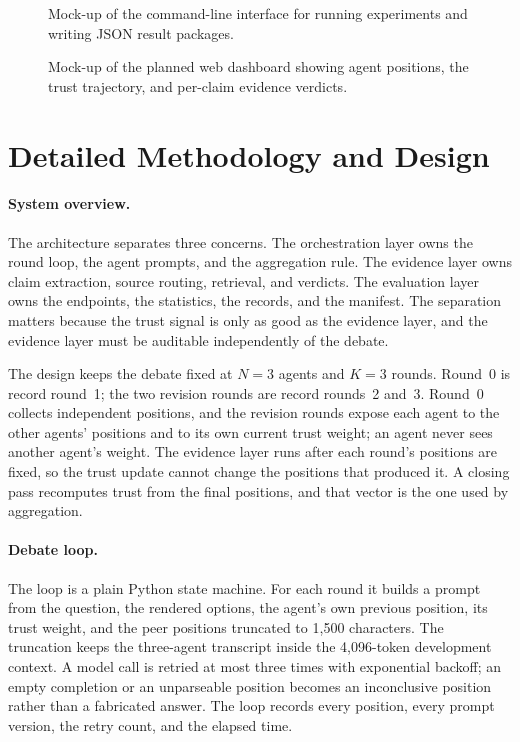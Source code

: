 \begin{figure}[H]
  \centering
  \caption{Mock-up of the command-line interface for running experiments and writing JSON result packages.}
  \label{fig:cli}
\end{figure}

\begin{figure}[H]
  \centering
  \caption{Mock-up of the planned web dashboard showing agent positions, the trust trajectory, and per-claim evidence verdicts.}
  \label{fig:dashboard}
\end{figure}

\section{Detailed Methodology and Design}\label{sec:detailed-methodology}

\paragraph*{System overview.}
The architecture separates three concerns. The orchestration layer owns the round loop, the agent prompts, and the aggregation rule. The evidence layer owns claim extraction, source routing, retrieval, and verdicts. The evaluation layer owns the endpoints, the statistics, the records, and the manifest. The separation matters because the trust signal is only as good as the evidence layer, and the evidence layer must be auditable independently of the debate.

The design keeps the debate fixed at $N=3$ agents and $K=3$ rounds. Round~0 is record round~1; the two revision rounds are record rounds~2 and~3. Round~0 collects independent positions, and the revision rounds expose each agent to the other agents' positions and to its own current trust weight; an agent never sees another agent's weight. The evidence layer runs after each round's positions are fixed, so the trust update cannot change the positions that produced it. A closing pass recomputes trust from the final positions, and that vector is the one used by aggregation.

\paragraph*{Debate loop.}
The loop is a plain Python state machine. For each round it builds a prompt from the question, the rendered options, the agent's own previous position, its trust weight, and the peer positions truncated to 1{,}500 characters. The truncation keeps the three-agent transcript inside the 4{,}096-token development context. A model call is retried at most three times with exponential backoff; an empty completion or an unparseable position becomes an inconclusive position rather than a fabricated answer. The loop records every position, every prompt version, the retry count, and the elapsed time.

